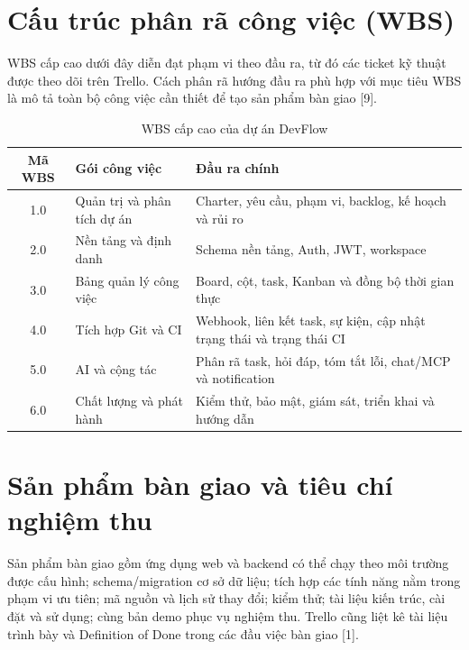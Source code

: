 \documentclass[12pt,a4paper]{report}
\begin{document}
\section{Cấu trúc phân rã công việc (WBS)}
WBS cấp cao dưới đây diễn đạt phạm vi theo đầu ra, từ đó các ticket kỹ thuật được theo dõi trên Trello. Cách phân rã hướng đầu ra phù hợp với mục tiêu WBS là mô tả toàn bộ công việc cần thiết để tạo sản phẩm bàn giao [9].

\begin{table}[H]
\centering
\caption{WBS cấp cao của dự án DevFlow}
\begin{tabularx}{\textwidth}{|c|X|X|}
\hline
\textbf{Mã WBS} & \textbf{Gói công việc} & \textbf{Đầu ra chính} \\
\hline
1.0 & Quản trị và phân tích dự án & Charter, yêu cầu, phạm vi, backlog, kế hoạch và rủi ro \\
2.0 & Nền tảng và định danh & Schema nền tảng, Auth, JWT, workspace \\
3.0 & Bảng quản lý công việc & Board, cột, task, Kanban và đồng bộ thời gian thực \\
4.0 & Tích hợp Git và CI & Webhook, liên kết task, sự kiện, cập nhật trạng thái và trạng thái CI \\
5.0 & AI và cộng tác & Phân rã task, hỏi đáp, tóm tắt lỗi, chat/MCP và notification \\
6.0 & Chất lượng và phát hành & Kiểm thử, bảo mật, giám sát, triển khai và hướng dẫn \\
\hline
\end{tabularx}
\end{table}

\section{Sản phẩm bàn giao và tiêu chí nghiệm thu}
Sản phẩm bàn giao gồm ứng dụng web và backend có thể chạy theo môi trường được cấu hình; schema/migration cơ sở dữ liệu; tích hợp các tính năng nằm trong phạm vi ưu tiên; mã nguồn và lịch sử thay đổi; kiểm thử; tài liệu kiến trúc, cài đặt và sử dụng; cùng bản demo phục vụ nghiệm thu. Trello cũng liệt kê tài liệu trình bày và Definition of Done trong các đầu việc bàn giao [1].
\end{document}
